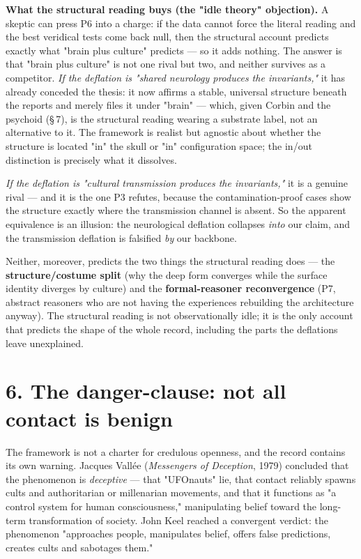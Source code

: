 \documentclass[11pt]{article}
\begin{document}
\textbf{What the structural reading buys (the "idle theory" objection).} A skeptic can press P6 into a charge: if the data cannot force the literal reading and the best veridical tests come back null, then the structural account predicts exactly what "brain plus culture" predicts --- so it adds nothing. The answer is that "brain plus culture" is not one rival but two, and neither survives as a competitor. \emph{If the deflation is "shared neurology produces the invariants,"} it has already conceded the thesis: it now affirms a stable, universal structure beneath the reports and merely files it under "brain" --- which, given Corbin and the psychoid (\S\,7), is the structural reading wearing a substrate label, not an alternative to it. The framework is realist but agnostic about whether the structure is located "in" the skull or "in" configuration space; the in/out distinction is precisely what it dissolves.

\emph{If the deflation is "cultural transmission produces the invariants,"} it is a genuine rival --- and it is the one P3 refutes, because the contamination-proof cases show the structure exactly where the transmission channel is absent. So the apparent equivalence is an illusion: the neurological deflation collapses \emph{into} our claim, and the transmission deflation is falsified \emph{by} our backbone.

Neither, moreover, predicts the two things the structural reading does --- the \textbf{structure/costume split} (why the deep form converges while the surface identity diverges by culture) and the \textbf{formal-reasoner reconvergence} (P7, abstract reasoners who are not having the experiences rebuilding the architecture anyway). The structural reading is not observationally idle; it is the only account that predicts the shape of the whole record, including the parts the deflations leave unexplained.

\section*{6. The danger-clause: not all contact is benign}
The framework is not a charter for credulous openness, and the record contains its own warning. Jacques Vallée (\emph{Messengers of Deception}, 1979) concluded that the phenomenon is \emph{deceptive} --- that "UFOnauts" lie, that contact reliably spawns cults and authoritarian or millenarian movements, and that it functions as "a control system for human consciousness," manipulating belief toward the long-term transformation of society. John Keel reached a convergent verdict: the phenomenon "approaches people, manipulates belief, offers false predictions, creates cults and sabotages them."
\end{document}
